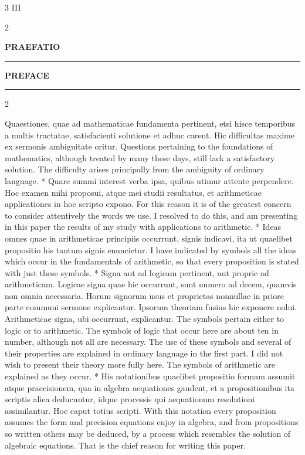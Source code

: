 \documentclass{book}
\newcommand{\s}{\switchcolumn} %
\newcommand\peanoHeadingLarge[1]{ \vspace{2cm} {\Large \textbf{\uppercase{#1}} \nopagebreak[4]}

  \noindent\rule{2cm}{0.4pt} \nopagebreak[1]}
\newcommand{\peanoPage}[1]{\vspace{1ex}

  \columnratio{0.475, 0.05, 0.475} \begin{paracol}{3} \centering \hdashrule{\columnwidth}{0.1mm}{0.1mm 1mm} \s #1 \s \hdashrule{\columnwidth}{0.1mm}{0.1mm 1mm} \end{paracol}

\vspace{1ex}}
\newenvironment{translateTwoCol}
               { %
                 \columnratio{0.5, 0.5} \begin{paracol}{2}
                 \newcommand{\LAT}{\switchcolumn[0]*}
                 \newcommand{\ENG}{\switchcolumn[1]}
               }
               { %
                 \let\ENG\undefined
                 \let\LAT\undefined
                 \end{paracol}
               }
\begin{document}
\pagebreak

\vspace{1em}
\peanoPage{III} %

\begin{translateTwoCol}
\centering
{}
{}
\peanoHeadingLarge{Praefatio}
\ENG
\peanoHeadingLarge{Preface}
\end{translateTwoCol}

\begin{translateTwoCol}
Quaestiones, quae ad mathematicae fundamenta pertinent, etsi hisce temporibus a multis tractatae, satisfacienti solutione et adhuc carent. Hic difficultas maxime ex sermonis ambiguitate oritur.
\ENG Questions pertaining to the foundations of mathematics, although treated by many these days, still lack a satisfactory solution. The difficulty arises principally from the ambiguity of ordinary language.
\LAT
Quare summi interest verba ipsa, quibus utimur attente perpendere. Hoc examen mihi proposui, atque mei studii resultatus, et arithmeticae applicationes in hoc scripto expono.
\ENG For this reason it is of the greatest concern to consider attentively the words we use. I resolved to do this, and am presenting in this paper the results of my study with applications to arithmetic.
\LAT
Ideas omnes quae in arithmeticae principiis occurrunt, signis indicavi, ita ut quaelibet propositio his tantum signis enuncietur.
\ENG I have indicated by symbols all the ideas which occur in the fundamentals of arithmetic, so that every proposition is stated with just these symbols.
\LAT
Signa aut ad logicam pertinent, aut proprie ad arithmeticam. Logicae signa quae hic occurrunt, sunt numero ad decem, quamvis non omnia necessaria. Horum signorum usus et proprietas nonnullae in priore parte communi sermone explicantur. Ipsorum theoriam fusius hic exponere nolui. Arithmeticae signa, ubi occurrunt, explicantur.
\ENG The symbols pertain either to logic or to arithmetic. The symbols of logic that occur here are about ten in number, although not all are necessary. The use of these symbols and several of their properties are explained in ordinary language in the first part. I did not wish to present their theory more fully here. The symbols of arithmetic are explained as they occur.
\LAT
His notationibus quaelibet propositio formam assumit atque praecisionem, qua in algebra aequationes gaudent, et a propositionibus ita scriptis aliea deducuntur, idque processis qui aequationum resolutioni assimilantur. Hoc caput totius scripti.
\ENG With this notation every proposition assumes the form and precision equations enjoy in algebra, and from propositions so written others may be deduced, by a process which resembles the solution of algebraic equations. That is the chief reason for writing this paper.

\end{translateTwoCol}
\end{document}

